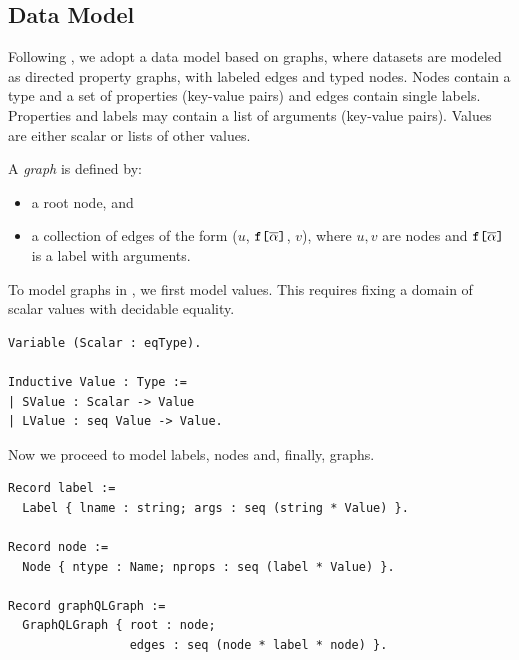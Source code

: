 \subsection{Data Model}\label{subsec:graph}
Following \HP, we adopt a data model based on graphs, where datasets are
modeled as directed property graphs, with labeled edges and typed
nodes. Nodes contain a type and a set of properties (key-value pairs)
and edges contain single labels. Properties and labels may contain a list of
arguments (key-value pairs). Values are either scalar or
lists of other values.  %
%
%
\begin{definition}
A \emph{\gql graph} is defined by:
\begin{itemize}
    \item a root node, and
    \item a collection of edges of the form ($u$, $\texttt{f[}\overline{\alpha}\texttt{]}$, $v$), where $u, v$ are nodes and
      $\texttt{f[}\overline{\alpha}\texttt{]}$ is a label with arguments.
\end{itemize}
\end{definition}
%
\noindent To model graphs in \coq, we first model values. This requires fixing a
domain of scalar values with decidable equality.


\begin{verbatim}
Variable (Scalar : eqType).

Inductive Value : Type :=
| SValue : Scalar -> Value 
| LValue : seq Value -> Value.
\end{verbatim}

Now we proceed to model labels, nodes and, finally, graphs. 

\begin{verbatim}
Record label := 
  Label { lname : string; args : seq (string * Value) }.

Record node := 
  Node { ntype : Name; nprops : seq (label * Value) }.

Record graphQLGraph := 
  GraphQLGraph { root : node; 
                 edges : seq (node * label * node) }.
\end{verbatim}

